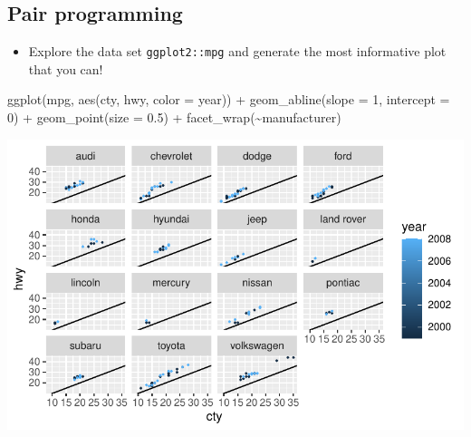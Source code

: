 \documentclass[
  letterpaper,
  DIV=11,
  numbers=noendperiod]{scrartcl}
\newenvironment{Shaded}{\begin{snugshade}}{\end{snugshade}}
\newcommand{\AttributeTok}[1]{\textcolor[rgb]{0.40,0.45,0.13}{#1}}
\newcommand{\DecValTok}[1]{\textcolor[rgb]{0.68,0.00,0.00}{#1}}
\newcommand{\FloatTok}[1]{\textcolor[rgb]{0.68,0.00,0.00}{#1}}
\newcommand{\FunctionTok}[1]{\textcolor[rgb]{0.28,0.35,0.67}{#1}}
\newcommand{\NormalTok}[1]{\textcolor[rgb]{0.00,0.23,0.31}{#1}}
\newcommand{\SpecialCharTok}[1]{\textcolor[rgb]{0.37,0.37,0.37}{#1}}
\providecommand{\tightlist}{%
  \setlength{\itemsep}{0pt}\setlength{\parskip}{0pt}}\usepackage{longtable,booktabs,array}
\begin{document}
\subsection{Pair programming}\label{pair-programming}

\begin{itemize}
\tightlist
\item
  Explore the data set \texttt{ggplot2::mpg} and generate the most
  informative plot that you can!
\end{itemize}

\begin{Shaded}
\begin{Highlighting}[]
\FunctionTok{ggplot}\NormalTok{(mpg, }\FunctionTok{aes}\NormalTok{(cty, hwy, }\AttributeTok{color =}\NormalTok{ year)) }\SpecialCharTok{+}
  \FunctionTok{geom\_abline}\NormalTok{(}\AttributeTok{slope =} \DecValTok{1}\NormalTok{, }\AttributeTok{intercept =} \DecValTok{0}\NormalTok{) }\SpecialCharTok{+}
  \FunctionTok{geom\_point}\NormalTok{(}\AttributeTok{size =} \FloatTok{0.5}\NormalTok{) }\SpecialCharTok{+}
  \FunctionTok{facet\_wrap}\NormalTok{(}\SpecialCharTok{\textasciitilde{}}\NormalTok{manufacturer)}
\end{Highlighting}
\end{Shaded}

\includegraphics{5-ggplot2_kevin_files/figure-pdf/unnamed-chunk-29-1.pdf}
\end{document}

